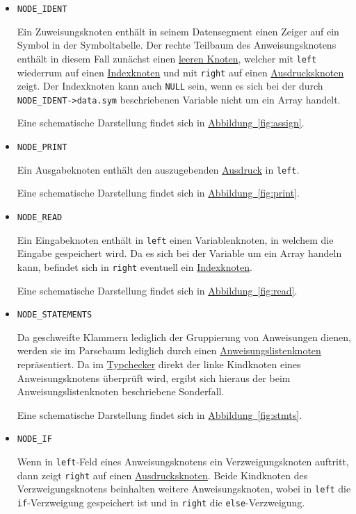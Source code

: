 \begin{itemize}
\item \texttt{NODE\_IDENT}

Ein Zuweisungsknoten enthält in seinem Datensegment einen Zeiger auf ein Symbol in der Symboltabelle.
Der rechte Teilbaum des Anweisungsknotens enthält in diesem Fall zunächst einen \hyperref[sec:nonenode]{leeren Knoten},
welcher mit \texttt{left} wiederrum auf einen \hyperref[sec:indexnode]{Indexknoten} und mit \texttt{right} auf einen \hyperref[sec:expnode]{Ausdrucksknoten} zeigt.
Der Indexknoten kann auch \texttt{NULL} sein,
wenn es sich bei der durch \texttt{NODE\_IDENT->data.sym} beschriebenen Variable nicht um ein Array handelt.

Eine schematische Darstellung findet sich in \hyperref[fig:stmtsnode]{Abbildung~\ref{fig:assign}}.

\item \texttt{NODE\_PRINT}

Ein Ausgabeknoten enthält den auszugebenden \hyperref[sec:expnode]{Ausdruck} in \texttt{left}.

Eine schematische Darstellung findet sich in \hyperref[fig:stmtsnode]{Abbildung~\ref{fig:print}}.

\item \texttt{NODE\_READ}

Ein Eingabeknoten enthält in \texttt{left} einen Variablenknoten,
in welchem die Eingabe gespeichert wird.
Da es sich bei der Variable um ein Array handeln kann,
befindet sich in \texttt{right} eventuell ein \hyperref[sec:indexnode]{Indexknoten}.

Eine schematische Darstellung findet sich in \hyperref[fig:stmtsnode]{Abbildung~\ref{fig:read}}.

\item \texttt{NODE\_STATEMENTS}

Da geschweifte Klammern lediglich der Gruppierung von Anweisungen dienen,
werden sie im Parsebaum lediglich durch einen \hyperref[sec:stmtsnode]{Anweisungslistenknoten} repräsentiert.
Da im \hyperref[sec:typecheck]{Typchecker} direkt der linke Kindknoten eines Anweisungsknotens überprüft wird,
ergibt sich hieraus der beim Anweisungslistenknoten beschriebene Sonderfall.

Eine schematische Darstellung findet sich in \hyperref[fig:stmtsnode]{Abbildung~\ref{fig:stmts}}.

\item \texttt{NODE\_IF}

Wenn in \texttt{left}-Feld eines Anweisungsknotens ein Verzweigungsknoten auftritt,
dann zeigt \texttt{right} auf einen \hyperref[sec:expnode]{Ausdrucksknoten}.
Beide Kindknoten des Verzweigungsknotens beinhalten weitere Anweisungsknoten,
wobei in \texttt{left} die \texttt{if}-Verzweigung gespeichert ist und in \texttt{right} die \texttt{else}-Verzweigung.


\end{itemize}
